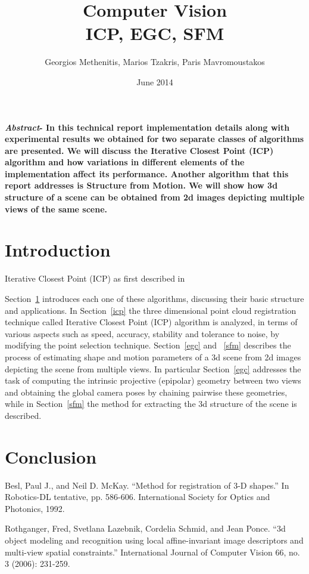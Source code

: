 \documentclass[11pt,twocolumn]{article}
\title{Computer Vision\\ICP, EGC, SFM}
\author{Georgios Methenitis, Marios Tzakris, Paris Mavromoustakos}
\affil{University of Amsterdam}
\date{June 2014}
\begin{document}
\maketitle

\renewcommand{\labelenumi}{\alph{enumi}.}



\textbf{\textit{Abstract}- In this technical report implementation details along with experimental results we obtained for two separate classes of algorithms are presented. We will discuss the Iterative Closest Point (ICP) algorithm and how variations in different elements of the implementation affect its performance. Another algorithm that this report addresses is Structure from Motion. We will show how 3d structure of a scene can be obtained from 2d images depicting multiple views of the same scene.}


\section{Introduction}
\label{introduction}
Iterative Closest Point (ICP) as first described in~\cite{icp} 
 
Section~\ref{introduction} introduces each one of these algorithms, discussing their basic structure and applications. In Section~\ref{icp} the three dimensional point cloud registration technique called Iterative Closest Point\cite{icp} (ICP) algorithm is analyzed, in terms of various aspects such as speed, accuracy, stability and tolerance to noise, by modifying the point selection
technique.
Section~\ref{egc} and ~\ref{sfm} describes the process of estimating shape and motion parameters of a 3d scene from 2d images depicting the scene from multiple views. In particular Section~\ref{egc} addresses the task of computing the intrinsic projective (epipolar) geometry between two views and obtaining the global camera poses by chaining pairwise these geometries, while in Section~\ref{sfm} the method for extracting the 3d structure of the scene is described.











\section{Conclusion}
\label{conclusion}


\begin{thebibliography}{9}

Besl, Paul J., and Neil D. McKay. ``Method for registration of 3-D shapes.'' In Robotics-DL tentative, pp. 586-606. International Society for Optics and Photonics, 1992.

Rothganger, Fred, Svetlana Lazebnik, Cordelia Schmid, and Jean Ponce. ``3d object modeling and recognition using local affine-invariant image descriptors and multi-view spatial constraints.'' International Journal of Computer Vision 66, no. 3 (2006): 231-259.

\end{thebibliography}
\end{document}
